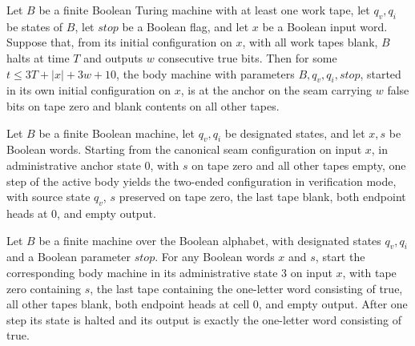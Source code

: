 \begin{lemma}
\label{Complexity.enumCont_body_start}
\leanok
{}
Let $B$ be a finite Boolean Turing machine with at least one work tape, let $q_v,q_i$ be
states of $B$, let $stop$ be a Boolean flag, and let $x$ be a Boolean input word.
Suppose that, from its initial configuration on $x$, with all work tapes blank, $B$
halts at time $T$ and outputs $w$ consecutive true bits. Then for some $t\le
3T+|x|+3w+10$, the body machine with parameters $B,q_v,q_i,stop$, started in its own
initial configuration on $x$, is at the anchor on the seam carrying $w$ false bits on
tape zero and blank contents on all other tapes.
\end{lemma}

\begin{lemma}
\label{Complexity.enumCont_body_depart}
\leanok
{}
Let $B$ be a finite Boolean machine, let $q_v,q_i$ be designated states, and let $x,s$
be Boolean words. Starting from the canonical seam configuration on input $x$, in
administrative anchor state $0$, with $s$ on tape zero and all other tapes empty, one
step of the active body yields the two-ended configuration in verification mode, with
source state $q_v$, $s$ preserved on tape zero, the last tape blank, both endpoint heads
at $0$, and empty output.
\end{lemma}

\begin{lemma}
\label{Complexity.enumCont_body_accept}
\leanok
{}
Let $B$ be a finite machine over the Boolean alphabet, with designated states $q_v,q_i$
and a Boolean parameter $stop$. For any Boolean words $x$ and $s$, start the
corresponding body machine in its administrative state $3$ on input $x$, with tape zero
containing $s$, the last tape containing the one-letter word consisting of true, all
other tapes blank, both endpoint heads at cell $0$, and empty output. After one step its
state is halted and its output is exactly the one-letter word consisting of true.
\end{lemma}

